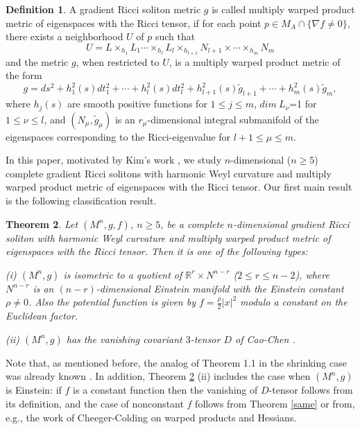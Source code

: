 \documentclass{amsart}
\newtheorem{theorem}{Theorem}[section]
\theoremstyle{definition}
\newtheorem{definition}[theorem]{Definition}
\theoremstyle{remark}
\numberwithin{equation}{section}
\begin{document}
\begin{definition}
A gradient Ricci soliton metric $g$ is called multiply warped product metric of eigenspaces with the Ricci tensor,
if for each point $p \in M_A \cap \{ \nabla f \neq 0  \}$, there exists a neighborhood $U$ of $p$ 
such that 
\[
U = L\times  _{h_1}L_1 \cdots \times _{h_l}L_l \times _{h_{l+1}}N_{l+1}\times\cdots \times _{h_{m}}N_{m}
\]
and the metric $g$, when restricted to $U$, is a multiply warped product metric of the form
\begin{equation*}
	g= ds^2 + h^2_1(s)  dt_1^2 + \cdots 
	+ h^2_l(s) dt_l^2+ h^2_{l+1}(s) \tilde{g}_{l+1}+ \cdots 
	+h^2_{m}(s) \tilde{g}_{m},
\end{equation*}
where $h_j(s)$ are smooth positive functions for $1\leq j \leq m$,
$dim ~L_\nu$=1 for $1\leq \nu \leq l$, and 
$(N_\mu, \tilde{g}_{\mu})$ is an $r_\mu$-dimensional integral submanifold of the eigenspaces corresponding to the Ricci-eigenvalue for $l+1\leq \mu \leq m$.	
\end{definition}

In this paper, motivated by Kim's work \cite{Kim}, we study $n$-dimensional ($n\geq 5$) complete gradient Ricci solitons with harmonic Weyl curvature and multiply warped product metric of eigenspaces with the Ricci tensor. Our first main result is the following classification result. 

\begin{theorem} \label{complete}
	Let $(M^n, g, f)$, $n\geq 5$,  be a complete $n$-dimensional gradient Ricci soliton with harmonic Weyl curvature and multiply warped product metric of eigenspaces  with the Ricci tensor. Then it is one of the following types:
		
	\smallskip	
	{\rm (i)} 
	$(M^n, g)$ is isometric to a quotient of $\mathbb{R}^{r}\times N^{n-r}$ ($2\leq r\leq n-2$), where $N^{n-r}$ is an $(n-r)$-dimensional Einstein manifold with the Einstein constant $\rho\neq 0$.
	Also the potential function is given by $f = \frac{\rho}{2} |x|^2$ modulo a constant on the Euclidean factor.  
	
	\smallskip	
	{\rm (ii)} $(M^n, g)$ has the vanishing covariant $3$-tensor $D$ of Cao-Chen \cite{CC1, CC2}. 
\end{theorem}

Note that, as mentioned before, the analog of Theorem 1.1 in the shrinking case was already known \cite{FG, MS}. In addition, Theorem \ref{complete} (ii) includes the case when $(M^n, g)$ is Einstein: if $f$ is a constant function then the vanishing of $D$-tensor follows from its definition, and the case of nonconstant $f$ follows from Theorem \ref{same} or from, e.g., the work of Cheeger-Colding \cite{CC} on warped products and Hessians.
\end{document}
